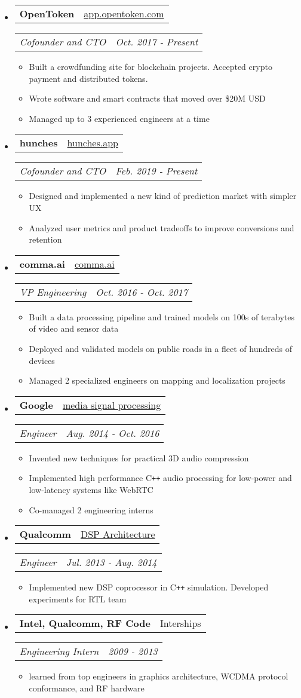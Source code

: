 \documentclass[hidelinks,letterpaper,10pt]{article}
\makeatletter
\newcommand{\resitem}[1]{\item #1 \vspace{-2pt}}
\newcommand{\resheading}[1]{{\large \parashade[.9]{sharpcorners}{\textbf{#1 \vphantom{p\^{E}}}}}
\vspace{-18pt}\noindent\makebox[\linewidth]{\rule{\textwidth}{1pt}}
}
\newcommand{\ressubheading}[4]{
\begin{tabular*}{6.5in}{l@{\extracolsep{\fill}}r}
        \textbf{#1} & #2
\end{tabular*}
\begin{tabular*}{6.5in}{l@{\extracolsep{\fill}}r}
        \textit{#3} & \textit{#4}
\end{tabular*}\vspace{-6pt}
}
\makeatother
\begin{document}
\resheading{Work}
\begin{itemize}
\item
	\ressubheading{OpenToken}{\href{https://app.opentoken.com}{app.opentoken.com}}{Cofounder and CTO}{Oct. 2017 - Present}
	\begin{itemize}
		\resitem{Built a crowdfunding site for blockchain projects. Accepted crypto payment and distributed tokens.}
		\resitem{Wrote software and smart contracts that moved over \$20M USD}
		\resitem{Managed up to 3 experienced engineers at a time}
	\end{itemize}

\item
	\ressubheading{hunches}{\href{https://hunches.app}{hunches.app}}{Cofounder and CTO}{Feb. 2019 - Present}
	\begin{itemize}
		\resitem{Designed and implemented a new kind of prediction market with simpler UX}
		\resitem{Analyzed user metrics and product tradeoffs to improve conversions and retention}
	\end{itemize}

\item
	\ressubheading{comma.ai}{\href{https://comma.ai}{comma.ai}}{VP Engineering}{Oct. 2016 - Oct. 2017}
	\begin{itemize}
		\resitem{Built a data processing pipeline and trained models on 100s of terabytes of video and sensor data}
		\resitem{Deployed and validated models on public roads in a fleet of hundreds of devices}
		\resitem{Managed 2 specialized engineers on mapping and localization projects}
	\end{itemize}

\item
	\ressubheading{Google}{\href{https://google.com}{media signal processing}}{Engineer}{Aug. 2014 - Oct. 2016}
	\begin{itemize}
		\resitem{Invented new techniques for practical 3D audio compression}
		\resitem{Implemented high performance C\texttt{++} audio processing for low-power and low-latency systems like WebRTC}
		\resitem{Co-managed 2 engineering interns}
	\end{itemize}

\item
	\ressubheading{Qualcomm}{\href{en.wikipedia.org/wiki/Qualcomm_Hexagon}{DSP Architecture}}{Engineer}{Jul. 2013 - Aug. 2014}
	\begin{itemize}
		\resitem{Implemented new DSP coprocessor in C\texttt{++} simulation. Developed experiments for RTL team}
	\end{itemize}

\item
	\ressubheading{Intel, Qualcomm, RF Code}{Interships}{Engineering Intern}{2009 - 2013}
	\begin{itemize}
		\resitem{learned from top engineers in graphics architecture, WCDMA protocol conformance, and RF hardware}
	\end{itemize}

\end{itemize}
\end{document}
